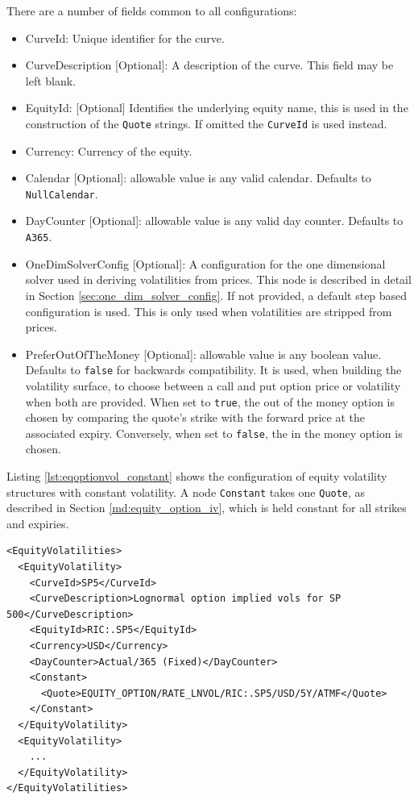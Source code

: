 There are a number of fields common to all configurations:
\begin{itemize}
\item CurveId: Unique identifier for the curve.
\item CurveDescription [Optional]: A description of the curve. This field may be left blank.
\item EquityId: [Optional] Identifies the underlying equity name, this is used in the construction of the \lstinline!Quote! strings. If omitted the \lstinline!CurveId! is used instead.
\item Currency: Currency of the equity.
\item Calendar [Optional]: allowable value is any valid calendar. Defaults to \lstinline!NullCalendar!.
\item DayCounter [Optional]: allowable value is any valid day counter. Defaults to \lstinline!A365!.
\item OneDimSolverConfig [Optional]: A configuration for the one dimensional solver used in deriving volatilities from prices. This node is described in detail in Section \ref{sec:one_dim_solver_config}. If not provided, a default step based configuration is used. This is only used when volatilities are stripped from prices.
\item PreferOutOfTheMoney [Optional]: allowable value is any boolean value. Defaults to \lstinline!false! for backwards compatibility. It is used, when building the volatility surface, to choose between a call and put option price or volatility when both are provided. When set to \lstinline!true!, the out of the money option is chosen by comparing the quote's strike with the forward price at the associated expiry. Conversely, when set to \lstinline!false!, the in the money option is chosen.
\end{itemize}

Listing \ref{lst:eqoptionvol_constant} shows the configuration of equity volatility structures with constant volatility. A node \lstinline!Constant! takes one \lstinline!Quote!, as described in Section \ref{md:equity_option_iv}, which is held constant for all strikes and expiries.

\begin{longlisting}
\begin{verbatim}
<EquityVolatilities>
  <EquityVolatility>
    <CurveId>SP5</CurveId>
    <CurveDescription>Lognormal option implied vols for SP 500</CurveDescription>
    <EquityId>RIC:.SP5</EquityId>
    <Currency>USD</Currency>
    <DayCounter>Actual/365 (Fixed)</DayCounter>
    <Constant>
      <Quote>EQUITY_OPTION/RATE_LNVOL/RIC:.SP5/USD/5Y/ATMF</Quote>
    </Constant>
  </EquityVolatility>
  <EquityVolatility>
    ...
  </EquityVolatility>
</EquityVolatilities>
\end{verbatim}
\caption{Equity option volatility configuration - constant}
\label{lst:eqoptionvol_constant}
\end{longlisting}

